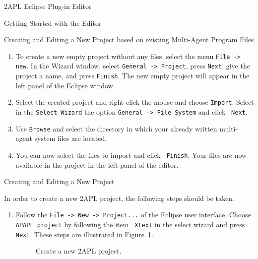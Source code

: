 \begin{section}{2APL Eclipse Plug-in Editor}
\begin{section}{Getting Started with the Editor}
\begin{subsection}{Creating and Editing a New Project based on existing Multi-Agent Program Files}
\begin{enumerate}
        \item To create a new empty project without any files, select the menu \texttt{File -> new}.
        In the Wizard window, select \texttt{General -> Project}, press {\tt Next}, give the project
        a name, and press {\tt Finish}. The new empty project will
        appear in the left panel of the Eclipse window.

        \item Select the created project and right click the mouse and choose {\tt Import}.
        Select in the {\tt Select Wizard} the option {\tt General -> File System} and click {\tt
        Next}.

        \item Use {\tt Browse} and select the directory in which your already written multi-agent system
        files are located.

        \item You can now select the files to import and click {\tt
        Finish}. Your files are now available in the project in the
        left panel of the editor.
\end{enumerate}

\end{subsection}

\begin{subsection}{Creating and Editing a New Project}

In order to create a new 2APL project, the following steps should be
taken.
\begin{enumerate}
        \item Follow the {\tt File -> New -> Project...} of the Eclipse user
        interface. Choose {\tt APAPL project} by following the item {\tt
        Xtext} in the select wizard and press {\tt Next}. These
        steps are illustrated in Figure~\ref{fig:usage1}.
        \begin{figure}[h]
            \begin{minipage}{0.6\linewidth}
                \begin{center}
                \end{center}
            \end{minipage}
            \hspace{.5cm}
            \begin{minipage}{0.3\linewidth}
                \begin{center}
                \end{center}
            \end{minipage}
            \caption{Create a new 2APL project.}\label{fig:usage1}
        \end{figure}


\end{enumerate}
\end{subsection}
\end{section}
\end{section}
